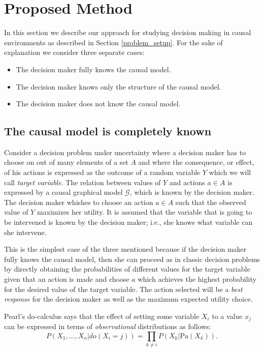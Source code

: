 \documentclass{article}
\begin{document}
\section{Proposed Method}
In this section we describe our approach for studying decision making in causal environments as described in Section \ref{problem_setup}. For the sake of explanation we consider three separate cases:

\begin{itemize}
\item The decision maker fully knows the causal model.
\item The decision maker knows only the structure of the causal model.
\item The decision maker does not know the causal model.
\end{itemize}

\subsection{The causal model is completely known}
Consider a decision problem under uncertainty where a decision maker has to choose on out of many elements of a set $A$ and where the consequence, or effect, of his actions is expressed as the outcome of a random variable $Y$ which we will call \textit{target variable}. The relation between values of $Y$ and actions $a \in A$ is expressed by a causal graphical model $\mathcal{G}$, which is known by the decision maker. The decision maker whishes to choose an action $a \in A$ such that the observed value of $Y$ maximizes her utility. It is assumed that the variable that is going to be intervened is known by the decision maker; i.e., she knows what variable can she intervene.

This is the simplest case of the three mentioned because if the decision maker fully knows the causal model, then she can proceed as in classic decision problems by directly obtaining the probabilities of different values for the target variable given that an action is made and choose $a$ which achieves the highest probability for the desired value of the target variable. The action selected will be a \textit{best response} for the decision maker as well as the maximum expected utility choice.

Pearl's do-calculus \cite{pearl2009causality} says that the effect of setting some variable $X_i$ to a value $x_j$ can be expressed in terms of \textit{observational} distributions as follows:
\[ P(X_1,...,X_n | do(X_i = j )) = \prod_{k \neq i} P(X_k | \textrm{Pa}(X_k)). \]
\end{document}
